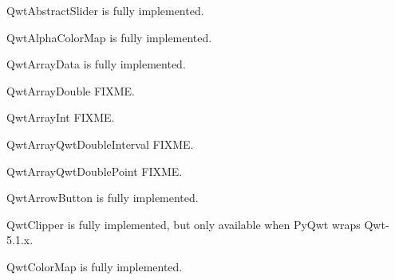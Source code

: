 \documentclass[a4paper,10pt,english]{manual}
\begin{document}
\hypertarget{PyQt4.Qwt5.QwtAbstractSlider}{}\begin{classdesc}{QwtAbstractSlider}{}
is fully implemented.
\end{classdesc}

\hypertarget{PyQt4.Qwt5.QwtAlphaColorMap}{}\begin{classdesc}{QwtAlphaColorMap}{}
is fully implemented.
\end{classdesc}

\hypertarget{PyQt4.Qwt5.QwtArrayData}{}\begin{classdesc}{QwtArrayData}{}
is fully implemented.
\end{classdesc}

\hypertarget{PyQt4.Qwt5.QwtArrayDouble}{}\begin{classdesc}{QwtArrayDouble}{}
FIXME.
\end{classdesc}

\hypertarget{PyQt4.Qwt5.QwtArrayInt}{}\begin{classdesc}{QwtArrayInt}{}
FIXME.
\end{classdesc}

\hypertarget{PyQt4.Qwt5.QwtArrayQwtDoubleInterval}{}\begin{classdesc}{QwtArrayQwtDoubleInterval}{}
FIXME.
\end{classdesc}

\hypertarget{PyQt4.Qwt5.QwtArrayQwtDoublePoint}{}\begin{classdesc}{QwtArrayQwtDoublePoint}{}
FIXME.
\end{classdesc}

\hypertarget{PyQt4.Qwt5.QwtArrowButton}{}\begin{classdesc}{QwtArrowButton}{}
is fully implemented.
\end{classdesc}

\hypertarget{PyQt4.Qwt5.QwtClipper}{}\begin{classdesc}{QwtClipper}{}
is fully implemented, but only available when PyQwt wraps Qwt-5.1.x.
\end{classdesc}

\hypertarget{PyQt4.Qwt5.QwtColorMap}{}\begin{classdesc}{QwtColorMap}{}
is fully implemented.
\end{classdesc}
\end{document}
